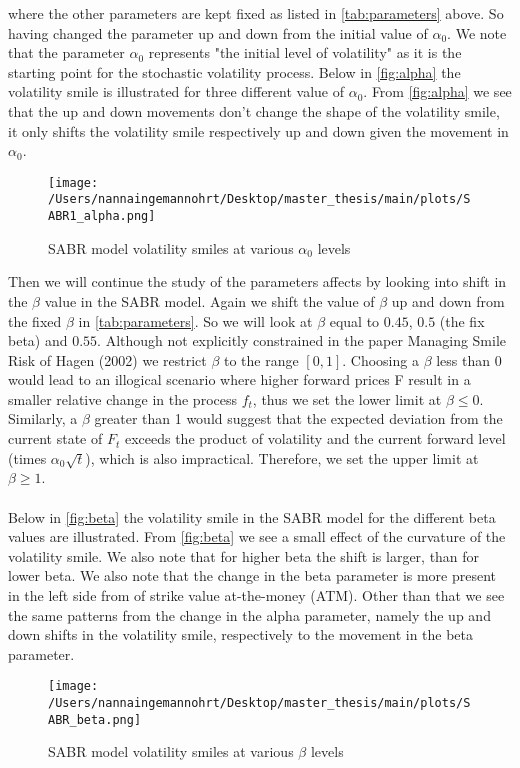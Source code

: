 where the other parameters are kept fixed as listed in \autoref{tab:parameters} above. So having changed the parameter
up and down from the initial value of $\alpha_0$.
We note that the parameter $\alpha_0$
represents "the initial level of volatility" as it is the starting point for the stochastic volatility process. 
Below in \autoref{fig:alpha} the volatility smile is illustrated for three different value of $\alpha_0$. 
From \autoref{fig:alpha} we see that the up and down movements don't change the shape of the volatility smile, 
it only shifts the volatility smile respectively up and down given the movement in $\alpha_0$.
\begin{figure}[H]
    \centering
    \texttt{[image: /Users/nannaingemannohrt/Desktop/master\_thesis/main/plots/SABR1\_alpha.png]}
    \caption{SABR model volatility smiles at various $\alpha_0$ levels}
    \label{fig:alpha}
\end{figure}
\noindent
Then we will continue the study of the parameters affects by looking into shift in the $\beta$ value in the SABR model.
Again we shift the value of $\beta$ up and down from the fixed $\beta$ in \autoref{tab:parameters}. So we will look at $\beta$ equal to $0.45$,
$0.5$ (the fix beta) and $0.55$. 
Although not explicitly constrained in the paper Managing Smile Risk 
of Hagen (2002) \cite{Smile} we restrict $\beta$ to the range $[0, 1]$. 
Choosing a $\beta$ less than 0 would lead to an illogical scenario where higher forward prices F result in a smaller 
relative change in the process $f_t$, thus we set the lower limit at $\beta \leq 0$. Similarly, a $\beta$ greater than 1 would 
suggest that the expected deviation from the current state of $F_t$ exceeds the product of volatility and the current 
forward level (times $\alpha_0 \sqrt{t}$), which is also impractical. Therefore, we set the upper limit at $\beta \geq 1$.
\\\\
Below in \autoref{fig:beta} the volatility smile in the SABR model for the different beta values are illustrated.
From \autoref{fig:beta} we see a small effect of the curvature of the volatility smile. We also note that for higher 
beta the shift is larger, than for lower beta. We also note that the change in the beta parameter is more present in 
the left side from of strike value at-the-money (ATM). Other than that we see the same patterns from the change in 
the alpha parameter, namely the up and down shifts in the volatility smile, respectively to the movement in the 
beta parameter.
\begin{figure}[H]
    \centering
    \texttt{[image: /Users/nannaingemannohrt/Desktop/master\_thesis/main/plots/SABR\_beta.png]}
    \caption{SABR model volatility smiles at various $\beta$ levels}
    \label{fig:beta}
\end{figure}
